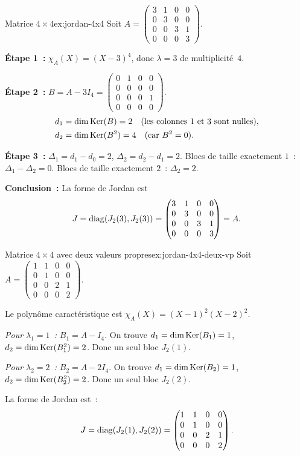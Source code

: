 \begin{example}{Matrice $4\times 4$}{ex:jordan-4x4}
  Soit $A=\begin{pmatrix}3&1&0&0\\0&3&0&0\\0&0&3&1\\0&0&0&3\end{pmatrix}$.

  \textbf{Étape 1~:} $\chi_A(X)=(X-3)^4$, donc $\lambda=3$ de multiplicité~$4$.

  \textbf{Étape 2~:} $B=A-3I_4=\begin{pmatrix}0&1&0&0\\0&0&0&0\\0&0&0&1\\0&0&0&0\end{pmatrix}$.
  \begin{align*}
    d_1&=\dim\operatorname{Ker}(B)=2\quad(\text{les colonnes 1 et 3 sont nulles}), \\
    d_2&=\dim\operatorname{Ker}(B^2)=4\quad(\text{car }B^2=0).
  \end{align*}

  \textbf{Étape 3~:}
  $\Delta_1=d_1-d_0=2$, $\Delta_2=d_2-d_1=2$.
  Blocs de taille exactement $1$~: $\Delta_1-\Delta_2=0$.
  Blocs de taille exactement $2$~: $\Delta_2=2$.

  \textbf{Conclusion~:} La forme de Jordan est
  \[
    J=\operatorname{diag}(J_2(3),J_2(3))
    =\begin{pmatrix}3&1&0&0\\0&3&0&0\\0&0&3&1\\0&0&0&3\end{pmatrix}=A.
  \]
\end{example}

\begin{example}{Matrice $4\times 4$ avec deux valeurs propres}{ex:jordan-4x4-deux-vp}
  Soit $A=\begin{pmatrix}1&1&0&0\\0&1&0&0\\0&0&2&1\\0&0&0&2\end{pmatrix}$.

  Le polynôme caractéristique est $\chi_A(X)=(X-1)^2(X-2)^2$.

  \emph{Pour $\lambda_1=1$~:} $B_1=A-I_4$. On trouve
  $d_1=\dim\operatorname{Ker}(B_1)=1$, $d_2=\dim\operatorname{Ker}(B_1^2)=2$. Donc un seul
  bloc $J_2(1)$.

  \emph{Pour $\lambda_2=2$~:} $B_2=A-2I_4$. On trouve
  $d_1=\dim\operatorname{Ker}(B_2)=1$, $d_2=\dim\operatorname{Ker}(B_2^2)=2$. Donc un seul
  bloc $J_2(2)$.

  La forme de Jordan est~:
  \[
    J=\operatorname{diag}(J_2(1),J_2(2))
    =\begin{pmatrix}1&1&0&0\\0&1&0&0\\0&0&2&1\\0&0&0&2\end{pmatrix}.
  \]
\end{example}

